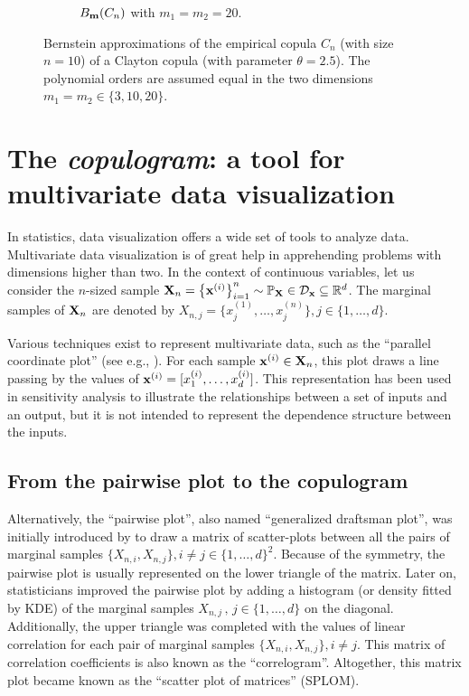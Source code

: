 \begin{figure}
\begin{subfigure}[b]{0.49\textwidth}
        \caption{$B_{{\bf m}}(C_n)$ with $m_1=m_2=20$.}
    \end{subfigure}
    \centering
    \caption{Bernstein approximations of the empirical copula $C_n$ (with size $n=10$) of a Clayton copula (with parameter $\theta=2.5$). The polynomial orders are assumed equal in the two dimensions $m_1=m_2\in\{3, 10, 20\}$.}
    \label{fig:ebc_illustration}
\end{figure}

\section{The \textit{copulogram}: a tool for multivariate data visualization}\label{sec:copulogram}
In statistics, data visualization offers a wide set of tools to analyze data. 
Multivariate data visualization is of great help in apprehending problems with dimensions higher than two. 
In the context of continuous variables, let us consider the $n$-sized sample ${\bf X}_n = \left\{{\bf x}^{(i)}\right\}_{i=1}^n \sim \mathbb{P}_{{\bf X}} \in \mathcal{D}_{{\bf x}}\subseteq\mathbb{R}^d$. 
The marginal samples of ${\bf X}_n$ are denoted by $X_{n, j} = \{x_j^{(1)}, \dots, x_j^{(n)}\}, j\in \{1, \dots, d\}$.

Various techniques exist to represent multivariate data, such as the ``parallel coordinate plot'' (see e.g., \citealp{heinrich_2013_cobweb}). 
For each sample ${\bf x}^{(i)} \in {\bf X}_n$, this plot draws a line passing by the values of ${\bf x}^{(i)} = [x_1^{(i)}, \dots, x_d^{(i)}]$. 
This representation has been used in sensitivity analysis to illustrate the relationships between a set of inputs and an output, but it is not intended to represent the dependence structure between the inputs. 

\subsection{From the pairwise plot to the copulogram}
Alternatively, the ``pairwise plot'', also named ``generalized draftsman plot'', was initially introduced by \citet{hartigan_1975_splom} to draw a matrix of scatter-plots between all the pairs of marginal samples $\{X_{n, i}, X_{n, j}\}, i \ne j \in \{1, \dots, d\}^2$. 
Because of the symmetry, the pairwise plot is usually represented on the lower triangle of the matrix. 
Later on, statisticians improved the pairwise plot by adding a histogram (or density fitted by KDE) of the marginal samples $X_{n, j}\, , \, j \in \{1, \dots, d\}$ on the diagonal. 
Additionally, the upper triangle was completed with the values of linear correlation for each pair of marginal samples $\{X_{n, i}, X_{n, j}\}, i \ne j$. 
This matrix of correlation coefficients is also known as the ``correlogram''. 
Altogether, this matrix plot became known as the ``scatter plot of matrices'' (SPLOM). 

